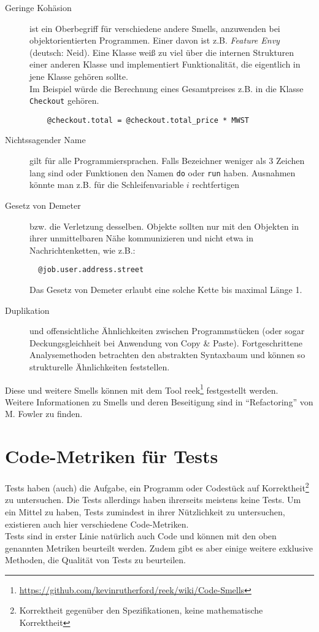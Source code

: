 \begin{description}
 \item[Geringe Kohäsion] ist ein Oberbegriff für verschiedene andere Smells, anzuwenden bei objektorientierten Programmen. Einer davon ist z.B. \textit{Feature Envy} (deutsch: Neid). Eine Klasse weiß zu viel über die internen Strukturen einer anderen Klasse und implementiert Funktionalität, die eigentlich in jene Klasse gehören sollte. \\
 Im Beispiel würde die Berechnung eines Gesamtpreises z.B. in die Klasse \texttt{Checkout} gehören.
 \begin{lstlisting}
    @checkout.total = @checkout.total_price * MWST
 \end{lstlisting}
 \item[Nichtssagender Name] gilt für alle Programmiersprachen. Falls Bezeichner weniger als 3 Zeichen lang sind oder Funktionen den Namen \texttt{do} oder \texttt{run} haben. Ausnahmen könnte man z.B. für die Schleifenvariable $i$ rechtfertigen
 \item[Gesetz von Demeter] bzw. die Verletzung desselben. Objekte sollten nur mit den Objekten in ihrer unmittelbaren Nähe kommunizieren und nicht etwa in Nachrichtenketten, wie z.B.:
 \begin{lstlisting}
  @job.user.address.street
 \end{lstlisting}
 Das Gesetz von Demeter erlaubt eine solche Kette bis maximal Länge 1.
 \item[Duplikation] und offensichtliche Ähnlichkeiten zwischen Programmstücken (oder sogar Deckungsgleichheit bei Anwendung von Copy \& Paste). Fortgeschrittene Analysemethoden betrachten den abstrakten Syntaxbaum und können so strukturelle Ähnlichkeiten feststellen.
 \end{description}

Diese und weitere Smells können mit dem Tool reek\footnote{\url{https://github.com/kevinrutherford/reek/wiki/Code-Smells}} festgestellt werden.\\
Weitere Informationen zu Smells und deren Beseitigung sind in "`Refactoring"' von M. Fowler \citep{fowler_refactoring_1999} zu finden.

\section{Code-Metriken für Tests}
\label{sec:metrics}
Tests haben (auch) die Aufgabe, ein Programm oder Codestück auf Korrektheit\footnote{Korrektheit gegenüber den Spezifikationen, keine mathematische Korrektheit} zu untersuchen. Die Tests allerdings haben ihrerseits meistens keine Tests. Um ein Mittel zu haben, Tests zumindest in ihrer Nützlichkeit zu untersuchen, existieren auch hier verschiedene Code-Metriken.\\
Tests sind in erster Linie natürlich auch Code und können mit den oben genannten Metriken beurteilt werden. Zudem gibt es aber einige weitere exklusive Methoden, die Qualität von Tests zu beurteilen.

